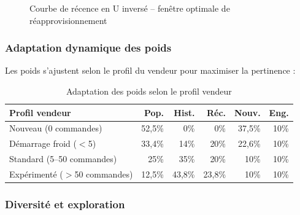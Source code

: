 \documentclass[12pt,a4paper,openany]{report}
\begin{document}
\begin{figure}[H]
\centering
{}
\caption{Courbe de récence en U inversé -- fenêtre optimale de réapprovisionnement}
\end{figure}

\subsubsection{Adaptation dynamique des poids}

Les poids s'ajustent selon le profil du vendeur pour maximiser la pertinence :

\begin{table}[H]
\centering
{}
\begin{tabular}{lrrrrr}
\toprule
\rowcolor{headerblue!20}
\textbf{Profil vendeur} & \textbf{Pop.} & \textbf{Hist.} & \textbf{Réc.} & \textbf{Nouv.} & \textbf{Eng.} \\
\midrule
Nouveau (0 commandes)         & 52,5\% &  0\%   &  0\%   & 37,5\% & 10\% \\
Démarrage froid ($<$5)        & 33,4\% & 14\%   & 20\%   & 22,6\% & 10\% \\
Standard (5--50 commandes)    & 25\%   & 35\%   & 20\%   & 10\%   & 10\% \\
Expérimenté ($>$50 commandes) & 12,5\% & 43,8\% & 23,8\% & 10\%   & 10\% \\
\bottomrule
\end{tabular}
\caption{Adaptation des poids selon le profil vendeur}
\end{table}

\subsubsection{Diversité et exploration}
\end{document}

